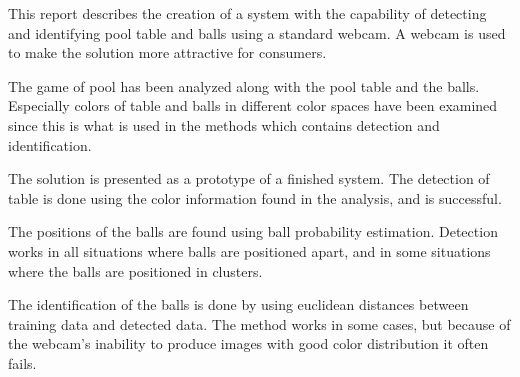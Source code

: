 This report describes the creation of a system with the capability of detecting and identifying pool table and balls using a standard webcam. A webcam is used to make the solution more attractive for consumers.

The game of pool has been analyzed along with the pool table and the balls. Especially colors of table and balls in different color spaces have been examined since this is what is used in the methods which contains detection and identification.

The solution is presented as a prototype of a finished system. The detection of table is done using the color information found in the analysis, and is successful. 

The positions of the balls are found using ball probability estimation. Detection works in all situations where balls are positioned apart, and in some situations where the balls are positioned in clusters.

The identification of the balls is done by using euclidean distances between training data and detected data. The method works in some cases, but because of the webcam's inability to produce images with good color distribution it often fails.